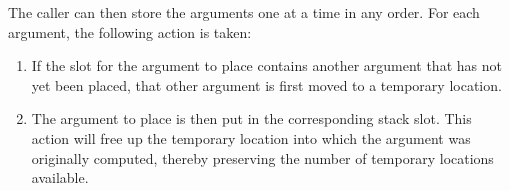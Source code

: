 The caller can then store the arguments one at a time in any order.
For each argument, the following action is taken:

\begin{enumerate}
\item If the slot for the argument to place contains another argument
  that has not yet been placed, that other argument is first moved to
  a temporary location.
\item The argument to place is then put in the corresponding stack
  slot.  This action will free up the temporary location into which
  the argument was originally computed, thereby preserving the number
  of temporary locations available.
\end{enumerate}


